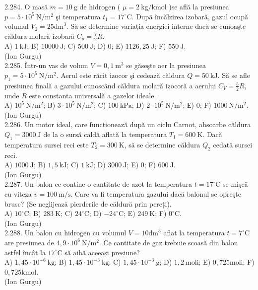 \documentclass[10pt]{article}
\begin{document}
2.284. O masă $m=10 \mathrm{~g}$ de hidrogen ( $\mu=2 \mathrm{~kg} / \mathrm{kmol}$ )se află la presiunea $p=5 \cdot 10^{5} \mathrm{~N} / \mathrm{m}^{2}$ şi temperatura $t_{1}=17^{\circ} \mathrm{C}$. Dupã încălzirea izobară, gazul ocupă volumul $V_{2}=25 \mathrm{dm}^{3}$. Să se determine variația energiei interne dacă se cunoaşte căldura molară izobară $C_{p}=\frac{7}{2} R$.\\ A) $1 \mathrm{~kJ}$; B) $10000 \mathrm{~J}$; C) $500 \mathrm{~J}$; D) 0; E) $1126,25 \mathrm{~J}$; F) $550 \mathrm{~J}$.\\ (Ion Gurgu)\\

2.285. Într-un vas de volum $V=0,1 \mathrm{~m}^{3}$ se găseşte aer la presiunea $p_{1}=5 \cdot 10^{5} \mathrm{~N} / \mathrm{m}^{2}$. Aerul este răcit izocor şi cedează căldura $Q=50 \mathrm{~kJ}$. Să se afle presiunea finală a gazului cunoscând căldura molară izocoră a aerului $C_{V}=\frac{5}{2} R$, unde $R$ este constanta universală a gazelor ideale.\\ A) $10^{5} \mathrm{~N} / \mathrm{m}^{2}$; B) $3 \cdot 10^{5} \mathrm{~N} / \mathrm{m}^{2}$; C) $100 \mathrm{~kPa}$; D) $2 \cdot 10^{5} \mathrm{~N} / \mathrm{m}^{2}$; Е) 0; F) $1000 \mathrm{~N} / \mathrm{m}^{2}$.\\ (Ion Gurgu)\\

2.286. Un motor ideal, care funcționează după un ciclu Carnot, absoarbe căldura $Q_{1}=3000 \mathrm{~J}$ de la o sursă caldă aflată la temperatura $T_{1}=600 \mathrm{~K}$. Dacă temperatura sursei reci este $T_{2}=300 \mathrm{~K}$, să se determine căldura $Q_{2}$ cedată sursei reci.\\ A) $1000 \mathrm{~J}$; B) $1,5 \mathrm{~kJ}$; C) $1 \mathrm{~kJ}$; D) $3000 \mathrm{~J}$; E) 0; F) $600 \mathrm{~J}$.\\ (Ion Gurgu)\\

2.287. Un balon ce contine o cantitate de azot la temperatura $t=17^{\circ} \mathrm{C}$ se mişcã cu viteza $v=100 \mathrm{~m} / \mathrm{s}$. Care va fi temperatura gazului dacă balonul se opreşte brusc? (Se neglijează pierderile de căldură prin pereți).\\ A) $10^{\circ} \mathrm{C}$; B) $283 \mathrm{~K}$; C) $24^{\circ} \mathrm{C}$; D) $-24^{\circ} \mathrm{C}$; E) $249 \mathrm{~K}$; F) $0^{\circ} \mathrm{C}$.\\ (Ion Gurgu)\\

2.288. Un balon cu hidrogen cu volumul $V=10 \mathrm{dm}^{3}$ aflat la temperatura $t=7^{\circ} \mathrm{C}$ are presiunea de $4,9 \cdot 10^{6} \mathrm{~N} / \mathrm{m}^{2}$. Ce cantitate de gaz trebuie scoasă din balon astfel încât la $17^{\circ} \mathrm{C}$ să aibă aceeași presiune?\\ A) $1,45 \cdot 10^{-6} \mathrm{~kg}$; B) $1,45 \cdot 10^{-3} \mathrm{~kg}$; C) $1,45 \cdot 10^{-3} \mathrm{~g}$; D) $1,2 \mathrm{~moli}$; E) $0,725 \mathrm{moli}$; F) $0,725 \mathrm{kmol}$.\\ (Ion Gurgu)\\
\end{document}
